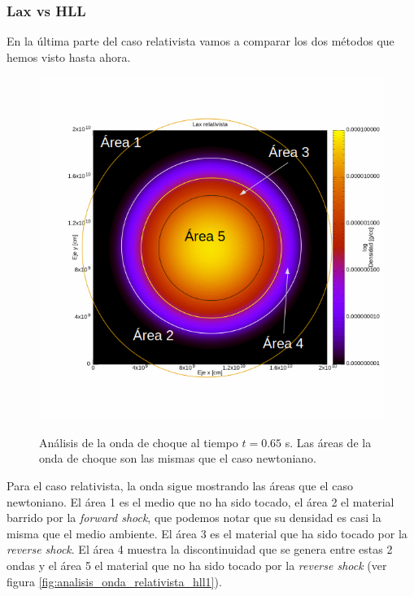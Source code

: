 \documentclass[12pt,a4paper]{book}
\begin{document}
\subsubsection{Lax vs HLL}
En la última parte del caso relativista vamos a comparar los dos métodos que hemos visto hasta ahora.


\begin{figure} 
\centering
{\includegraphics[scale=0.5]{./Figuras/Pruebas/Prueba_onda_choque/Lax-HLL-rel/bwlax-rel65-analisis}}
\caption{\label{fig:analisis_onda_relativista_lax1}Análisis de la onda de choque al tiempo $t = 0.65$ s. Las áreas de la onda de choque son las mismas que el caso newtoniano.}
\end{figure}

Para el caso relativista, la onda sigue mostrando las áreas que el caso newtoniano. El área 1 es el medio que no ha sido tocado, el área 2 el material barrido por la \emph{forward shock}, que podemos notar que su densidad es casi la misma que el medio ambiente. El área 3 es el material que ha sido tocado por la \emph{reverse shock}. El área 4 muestra la discontinuidad que se genera entre estas 2 ondas y el área 5 el material que no ha sido tocado por la \emph{reverse shock} (ver figura \ref{fig:analisis_onda_relativista_hll1}).
\end{document}
